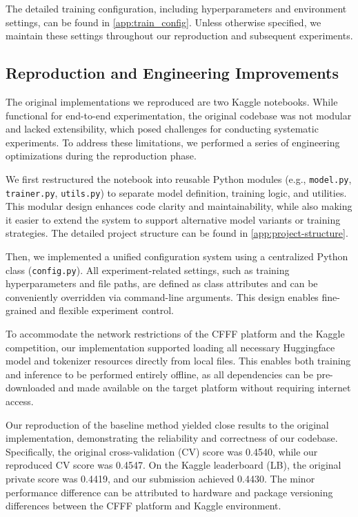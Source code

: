 \documentclass[12pt]{article}
\begin{document}
The detailed training configuration, including hyperparameters and environment settings, can be found in \autoref{app:train_config}. Unless otherwise specified, we maintain these settings throughout our reproduction and subsequent experiments.



\subsection{Reproduction and Engineering Improvements}
The original implementations we reproduced are two Kaggle notebooks. While functional for end-to-end experimentation, the original codebase was not modular and lacked extensibility, which posed challenges for conducting systematic experiments. To address these limitations, we performed a series of engineering optimizations during the reproduction phase.

We first restructured the notebook into reusable Python modules (e.g., \texttt{model.py}, \texttt{trainer.py}, \texttt{utils.py}) to separate model definition, training logic, and utilities. This modular design enhances code clarity and maintainability, while also making it easier to extend the system to support alternative model variants or training strategies. The detailed project structure can be found in \autoref{app:project-structure}.

Then, we implemented a unified configuration system using a centralized Python class (\texttt{config.py}). All experiment-related settings, such as training hyperparameters and file paths, are defined as class attributes and can be conveniently overridden via command-line arguments. This design enables fine-grained and flexible experiment control.

To accommodate the network restrictions of the CFFF platform and the Kaggle competition, our implementation supported loading all necessary Huggingface model and tokenizer resources directly from local files. This enables both training and inference to be performed entirely offline, as all dependencies can be pre-downloaded and made available on the target platform without requiring internet access.

Our reproduction of the baseline method yielded close results to the original implementation, demonstrating the reliability and correctness of our codebase. Specifically, the original cross-validation (CV) score was 0.4540, while our reproduced CV score was 0.4547. On the Kaggle leaderboard (LB), the original private score was 0.4419, and our submission achieved 0.4430. The minor performance difference can be attributed to hardware and package versioning differences between the CFFF platform and Kaggle environment. 
\end{document}
